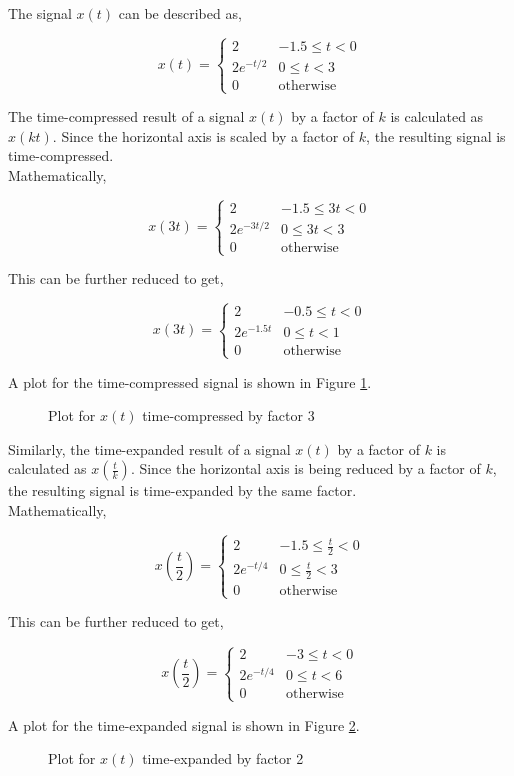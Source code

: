 \documentclass{article}[12 pt]
\newcommand{\ab}[5]{
\begin{equation*}
x\left(#5\right)=\begin{cases}
  2 & #1\leq #2<0\\
  #3 & 0\leq #2<#4\\
  0 & \text{otherwise}
\end{cases}
\end{equation*}
}
\begin{document}
\begin{solution}{
The signal $x(t)$ can be described as,
\ab{-1.5}{t}{2e^{-t/2}}{3}{t}
The time-compressed result of a signal $x(t)$ by a factor of $k$ is calculated as $x(kt)$. Since the horizontal axis is scaled by a factor of $k$, the resulting signal is time-compressed.\\ Mathematically,
\ab{-1.5}{3t}{2e^{-3t/2}}{3}{3t}
This can be further reduced to get,
\ab{-0.5}{t}{2e^{-1.5t}}{1}{3t}
A plot for the time-compressed signal is shown in Figure \ref{fig:tc}.
\begin{figure}[H]
\centering
{}
\caption{Plot for $x(t)$ time-compressed by factor 3}
\label{fig:tc}
\end{figure}
Similarly, the time-expanded result of a signal $x(t)$ by a factor of $k$ is calculated as $x(\frac{t}{k})$. Since the horizontal axis is being reduced by a factor of $k$, the resulting signal is time-expanded by the same factor.\\
Mathematically,
\ab{-1.5}{\frac{t}{2}}{2e^{-t/4}}{3}{\frac{t}{2}}
This can be further reduced to get,
\ab{-3}{t}{2e^{-t/4}}{6}{\frac{t}{2}}
A plot for the time-expanded signal is shown in Figure \ref{fig:te}.
\begin{figure}[H]
\centering
{}
\caption{Plot for $x(t)$ time-expanded by factor 2}
\label{fig:te}
\end{figure}
}

\end{solution}
\end{document}
